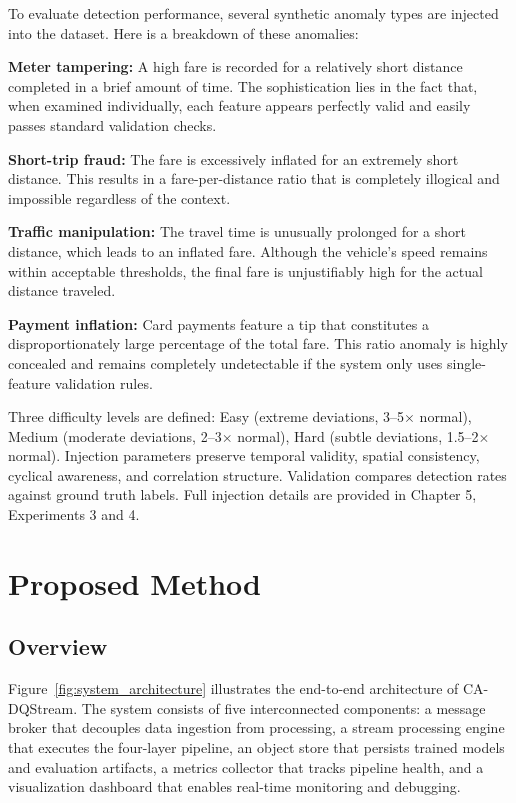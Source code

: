 To evaluate detection performance, several synthetic anomaly types are injected into the dataset. Here is a breakdown of these anomalies:

\textbf{Meter tampering:} A high fare is recorded for a relatively short distance completed in a brief amount of time. The sophistication lies in the fact that, when examined individually, each feature appears perfectly valid and easily passes standard validation checks.

\textbf{Short-trip fraud:} The fare is excessively inflated for an extremely short distance. This results in a fare-per-distance ratio that is completely illogical and impossible regardless of the context.

\textbf{Traffic manipulation:} The travel time is unusually prolonged for a short distance, which leads to an inflated fare. Although the vehicle's speed remains within acceptable thresholds, the final fare is unjustifiably high for the actual distance traveled.

\textbf{Payment inflation:} Card payments feature a tip that constitutes a disproportionately large percentage of the total fare. This ratio anomaly is highly concealed and remains completely undetectable if the system only uses single-feature validation rules.

Three difficulty levels are defined: Easy (extreme deviations, 3--5$\times$ normal), Medium (moderate deviations, 2--3$\times$ normal), Hard (subtle deviations, 1.5--2$\times$ normal). Injection parameters preserve temporal validity, spatial consistency, cyclical awareness, and correlation structure. Validation compares detection rates against ground truth labels. Full injection details are provided in Chapter 5, Experiments 3 and 4.

\section{Proposed Method}

\subsection{Overview}

Figure~\ref{fig:system_architecture} illustrates the end-to-end architecture of CA-DQStream. The system consists of five interconnected components: a message broker that decouples data ingestion from processing, a stream processing engine that executes the four-layer pipeline, an object store that persists trained models and evaluation artifacts, a metrics collector that tracks pipeline health, and a visualization dashboard that enables real-time monitoring and debugging.

